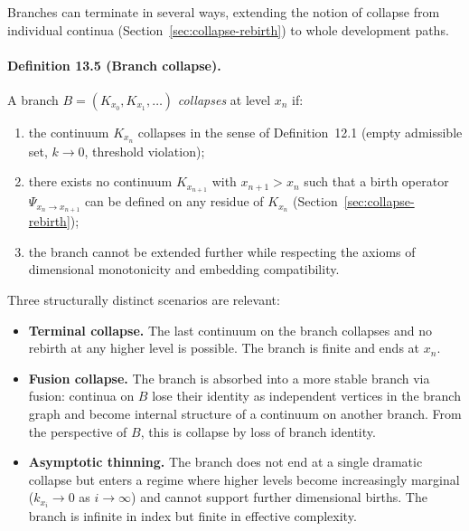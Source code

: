 Branches can terminate in several ways, extending the notion of collapse from
individual continua (Section~\ref{sec:collapse-rebirth}) to whole development
paths.

\paragraph{Definition 13.5 (Branch collapse).}
A branch \(B = (K_{x_0}, K_{x_1}, \dots)\) \emph{collapses} at level
\(x_n\) if:
\begin{enumerate}
  \item the continuum \(K_{x_n}\) collapses in the sense of
        Definition~12.1 (empty admissible set, \(k\to 0\), threshold
        violation);
  \item there exists no continuum \(K_{x_{n+1}}\) with \(x_{n+1}>x_n\)
        such that a birth operator \(\Psi_{x_n\to x_{n+1}}\) can be
        defined on any residue of \(K_{x_n}\) (Section~\ref{sec:collapse-rebirth});
  \item the branch cannot be extended further while respecting the axioms
        of dimensional monotonicity and embedding compatibility.
\end{enumerate}

Three structurally distinct scenarios are relevant:

\begin{itemize}
  \item \textbf{Terminal collapse.}\quad
        The last continuum on the branch collapses and no rebirth at any
        higher level is possible. The branch is finite and ends at \(x_n\).
  \item \textbf{Fusion collapse.}\quad
        The branch is absorbed into a more stable branch via fusion:
        continua on \(B\) lose their identity as independent vertices in
        the branch graph and become internal structure of a continuum on
        another branch. From the perspective of \(B\), this is collapse by
        loss of branch identity.
  \item \textbf{Asymptotic thinning.}\quad
        The branch does not end at a single dramatic collapse but enters a
        regime where higher levels become increasingly marginal
        (\(k_{x_i}\to 0\) as \(i\to\infty\)) and cannot support further
        dimensional births. The branch is infinite in index but finite in
        effective complexity.
\end{itemize}


